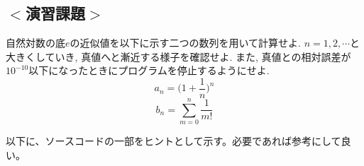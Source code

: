 \subsection*{$<$演習課題$>$}
自然対数の底$e$の近似値を以下に示す二つの数列を用いて計算せよ.
$n=1, 2, \cdots$と大きくしていき, 真値へと漸近する様子を確認せよ.
また, 真値との相対誤差が$10^{-10}$以下になったときにプログラムを停止するようにせよ.
\begin{equation}
a_n= \Big( 1+\frac{1}{n}\Big)^n
\end{equation}
\begin{equation}
b_n=\sum_{m=0}^{n}\frac{1}{m!}
\end{equation}

以下に、ソースコードの一部をヒントとして示す。必要であれば参考にして良い。


